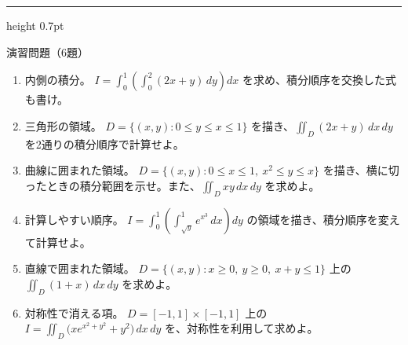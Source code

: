 \documentclass[a4paper,10pt,pdflatex,ja=standard,jafont=ipaex-type1,
  magstyle=real,scale=1]{bxjsarticle}
\newcommand{\topic}[1]{\par\vspace{5pt}%
  {\large\sffamily\mdseries\color{accent}#1}\par\vspace{2pt}}
\newenvironment{problems}
  {\begin{enumerate}[leftmargin=2em,itemsep=3pt,topsep=3pt,parsep=0pt,
    font=\color{accent}]}
  {\end{enumerate}}
\newcommand{\examplelabel}[1]{{\sffamily\mdseries\color{ink}#1}}
\newcommand{\problemspace}{\par\vspace{5mm}}
\newcommand{\exercises}{%
  {\color{accent}\hrule height 0.7pt}\vspace{3pt}%
  \topic{演習問題（6題）}%
\par}
\begin{document}
\noindent\begin{minipage}[b][0.5\textheight][t]{\linewidth}
\exercises
\begin{problems}
\item \examplelabel{内側の積分。}
$I=\displaystyle\int_0^1\left(\int_0^2(2x+y)\,dy\right)dx$ を求め、積分順序を交換した式も書け。
\problemspace
\item \examplelabel{三角形の領域。}
$D=\{(x,y):0\le y\le x\le1\}$ を描き、$\iint_D(2x+y)\,dx\,dy$ を2通りの積分順序で計算せよ。
\problemspace
\item \examplelabel{曲線に囲まれた領域。}
$D=\{(x,y):0\le x\le1,\ x^2\le y\le x\}$ を描き、横に切ったときの積分範囲を示せ。また、$\iint_Dxy\,dx\,dy$ を求めよ。
\problemspace
\item \examplelabel{計算しやすい順序。}
$I=\displaystyle\int_0^1\left(\int_{\sqrt y}^1e^{x^3}\,dx\right)dy$ の領域を描き、積分順序を変えて計算せよ。
\problemspace
\item \examplelabel{直線で囲まれた領域。}
$D=\{(x,y):x\ge0,\ y\ge0,\ x+y\le1\}$ 上の $\iint_D(1+x)\,dx\,dy$ を求めよ。
\problemspace
\item \examplelabel{対称性で消える項。}
$D=[-1,1]\times[-1,1]$ 上の $I=\iint_D\bigl(xe^{x^2+y^2}+y^2\bigr)\,dx\,dy$ を、対称性を利用して求めよ。
\problemspace
\end{problems}
\end{minipage}
\end{document}
